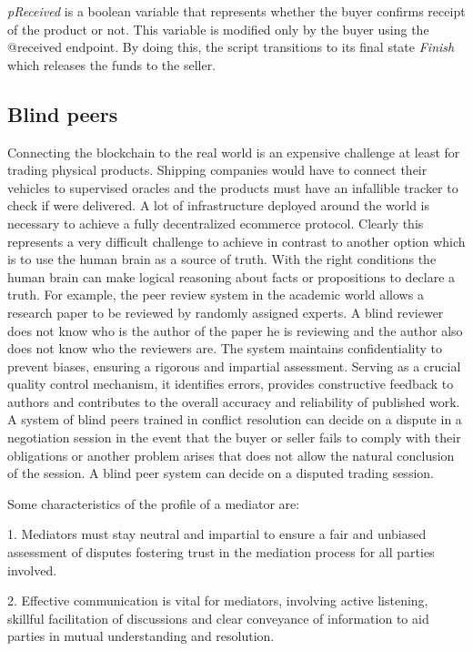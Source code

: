 \documentclass[12pt]{article}
\begin{document}
\emph{pReceived} is a boolean variable that represents whether the buyer confirms receipt of the product or not. This variable is modified only by the buyer using the @received endpoint.
By doing this, the script transitions to its final state \emph{Finish} which releases the funds to the seller.
 
\subsection { Blind peers }  

Connecting the blockchain to the real world is an expensive challenge at least for trading physical products.
Shipping companies would have to connect their vehicles to supervised oracles and the products must have an infallible tracker to check if were delivered.
A lot of infrastructure deployed around the world is necessary to achieve a fully decentralized ecommerce protocol.
Clearly this represents a very difficult challenge to achieve in contrast to another option which is to use the human brain as a source of truth.
With the right conditions the human brain can make logical reasoning about facts or propositions to declare a truth.
For example, the peer review system in the academic world allows a research paper to be reviewed by randomly assigned experts.
A blind reviewer does not know who is the author of the paper he is reviewing and the author also does not know who the reviewers are.
The system maintains confidentiality to prevent biases, ensuring a rigorous and impartial assessment. Serving as a crucial quality control mechanism, it identifies errors, provides constructive feedback to authors and contributes to the overall accuracy and reliability of published work. 
A system of blind peers trained in conflict resolution can decide on a dispute in a negotiation session in the event that the buyer or seller fails to comply with their obligations or another problem arises that does not allow the natural conclusion of the session.
A blind peer system can decide on a disputed trading session.

Some characteristics of the profile of a mediator are:

1. Mediators must stay neutral and impartial to ensure a fair and unbiased assessment of disputes fostering trust in the mediation process for all parties involved.

2. Effective communication is vital for mediators, involving active listening, skillful facilitation of discussions and clear conveyance of information to aid parties in mutual understanding and resolution.
\end{document}
